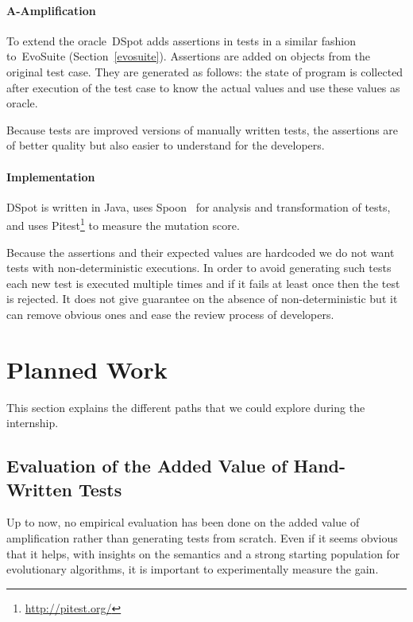 \documentclass[11pt]{sdm}
\newcommand{\dspot}{DSpot\xspace}
\newcommand{\evosuite}{EvoSuite\xspace}
\begin{document}
\paragraph{A-Amplification}
To extend the oracle~\dspot{} adds assertions in tests in a similar fashion to~\evosuite{} (Section~\ref{evosuite}).
Assertions are added on objects from the original test case.
They are generated as follows: the state of program is collected after execution of the test case to know the actual values and use these values as oracle.

Because tests are improved versions of manually written tests, the assertions are of better quality but also easier to understand for the developers.

\paragraph{Implementation}
\dspot{} is written in Java, uses Spoon~\cite{pawlak2016spoon} for analysis and transformation of tests, and uses Pitest\footnote{\url{http://pitest.org/}} to measure the mutation score.

Because the assertions and their expected values are hardcoded we do not want tests with non-deterministic executions.
In order to avoid generating such tests each new test is executed multiple times and if it fails at least once then the test is rejected.
It does not give guarantee on the absence of non-deterministic but it can remove obvious ones and ease the review process of developers.


\section{Planned Work}
\label{planned}
This section explains the different paths that we could explore during the internship.

\subsection{Evaluation of the Added Value of Hand-Written Tests}
\label{evaluation}
Up to now, no empirical evaluation has been done on the added value of amplification rather than generating tests from scratch.
Even if it seems obvious that it helps, with insights on the semantics and a strong starting population for evolutionary algorithms, it is important to experimentally measure the gain.

\end{document}
